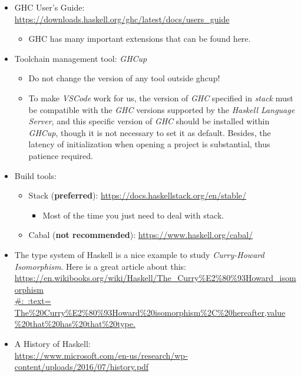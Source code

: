 \documentclass{article}
\begin{document}
\begin{itemize}
\begin{itemize}
\begin{itemize}
        \end{itemize}
        \item GHC User’s Guide:\\
        \href{https://downloads.haskell.org/ghc/latest/docs/users_guide}{https://downloads.haskell.org/ghc/latest/docs/users\_guide}
        \begin{itemize}
            \item GHC has many important extensions that can be found here.
        \end{itemize}
        \item Toolchain management tool: \emph{GHCup}
        \begin{itemize}
            \item Do not change the version of any tool outside ghcup!
            \item To make \emph{VSCode} work for us, the version of \emph{GHC} specified in \emph{stack} must be compatible with the \emph{GHC} versions supported by the \emph{Haskell Language Server}, and this specific version of \emph{GHC} should be installed within \emph{GHCup}, though it is not necessary to set it as default.
            Besides, the latency of initialization when opening a project is substantial, thus patience required.
        \end{itemize}
        \item Build tools:
        \begin{itemize}
            \item Stack (\textbf{preferred}):
            \href{https://docs.haskellstack.org/en/stable/}{https://docs.haskellstack.org/en/stable/}
            \begin{itemize}
                \item Most of the time you just need to deal with stack.
            \end{itemize}
            \item Cabal (\textbf{not recommended}):
            \href{https://www.haskell.org/cabal/}{https://www.haskell.org/cabal/}
            
        \end{itemize}
        \item The type system of Haskell is a nice example to study \emph{Curry-Howard Isomorphism}. Here is a great article about this:\\
        \href{https://en.wikibooks.org/wiki/Haskell/The_Curry%E2%80%93Howard_isomorphism#:~:text=The%20Curry%E2%80%93Howard%20isomorphism%2C%20hereafter,value%20that%20has%20that%20type.}{https://en.wikibooks.org/wiki/Haskell/The\_Curry\%E2\%80\%93Howard\_isomorphism\\
        #:~:text=  The\%20Curry\%E2\%80\%93Howard\%20isomorphism\%2C\%20hereafter,value\\
        \%20that\%20has\%20that\%20type.
        }
        \item A History of Haskell:\\
        \href{https://www.microsoft.com/en-us/research/wp-content/uploads/2016/07/history.pdf}{https://www.microsoft.com/en-us/research/wp-content/uploads/2016/07/history.pdf}
        

\end{itemize}
\end{itemize}
\end{document}
